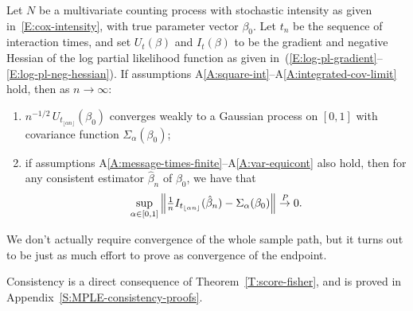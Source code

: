 \documentclass[final]{statsoc}
\begin{document}
\begin{theorem}\label{T:score-fisher}
    Let $N$ be a multivariate counting process with stochastic
    intensity as given in~\eqref{E:cox-intensity}, with true parameter
    vector $\beta_0$.  Let $t_n$ be the sequence of interaction times,
    and set $U_t(\beta)$ and $I_t(\beta)$ to
    be the gradient and negative Hessian of the log partial likelihood
    function
    as given in~(\ref{E:log-pl-gradient}--\ref{E:log-pl-neg-hessian}).  If
    assumptions A\ref{A:square-int}--A\ref{A:integrated-cov-limit} hold, then
    as $n \to \infty$:
    \begin{enumerate}
        \item \label{I:score-part}
        $n^{-1/2} \, U_{t_{\lfloor \alpha n \rfloor}}(\beta_0)$
        converges weakly to a Gaussian process on $[0,1]$ with
        covariance function $\Sigma_\alpha(\beta_0)$;

        \item \label{I:fisher-part}
        if assumptions
        A\ref{A:message-times-finite}--A\ref{A:var-equicont} also hold, then for any consistent
        estimator $\hat \beta_n$ of $\beta_0$,
        we have that
        \[
            \sup_{\alpha \in [0,1]}
            \left\|
                \tfrac{1}{n}
                I_{t_{\lfloor \alpha n \rfloor}}(\hat \beta_{n})
                -
                \Sigma_\alpha(\beta_0)
            \right\|
            \overset{\mathit{P}}{\to}
            0.
        \]
    \end{enumerate}
\end{theorem}

\noindent
We don't actually require convergence of the whole sample path, but
it turns out to be just as much effort to prove as convergence of the
endpoint.

Consistency is a direct consequence of Theorem~\ref{T:score-fisher},
and is proved in Appendix~\ref{S:MPLE-consistency-proofs}.
\end{document}
